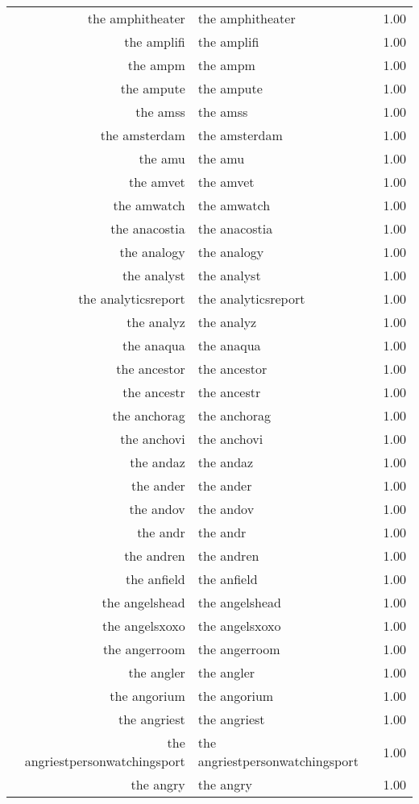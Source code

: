 \begin{table}[ht]
\begin{tabular}{rlr}
  the amphitheater & the amphitheater & 1.00 \\ 
  the amplifi & the amplifi & 1.00 \\ 
  the ampm & the ampm & 1.00 \\ 
  the ampute & the ampute & 1.00 \\ 
  the amss & the amss & 1.00 \\ 
  the amsterdam & the amsterdam & 1.00 \\ 
  the amu & the amu & 1.00 \\ 
  the amvet & the amvet & 1.00 \\ 
  the amwatch & the amwatch & 1.00 \\ 
  the anacostia & the anacostia & 1.00 \\ 
  the analogy & the analogy & 1.00 \\ 
  the analyst & the analyst & 1.00 \\ 
  the analyticsreport & the analyticsreport & 1.00 \\ 
  the analyz & the analyz & 1.00 \\ 
  the anaqua & the anaqua & 1.00 \\ 
  the ancestor & the ancestor & 1.00 \\ 
  the ancestr & the ancestr & 1.00 \\ 
  the anchorag & the anchorag & 1.00 \\ 
  the anchovi & the anchovi & 1.00 \\ 
  the andaz & the andaz & 1.00 \\ 
  the ander & the ander & 1.00 \\ 
  the andov & the andov & 1.00 \\ 
  the andr & the andr & 1.00 \\ 
  the andren & the andren & 1.00 \\ 
  the anfield & the anfield & 1.00 \\ 
  the angelshead & the angelshead & 1.00 \\ 
  the angelsxoxo & the angelsxoxo & 1.00 \\ 
  the angerroom & the angerroom & 1.00 \\ 
  the angler & the angler & 1.00 \\ 
  the angorium & the angorium & 1.00 \\ 
  the angriest & the angriest & 1.00 \\ 
  the angriestpersonwatchingsport & the angriestpersonwatchingsport & 1.00 \\ 
  the angry & the angry & 1.00 \\ 

\end{tabular}
\end{table}
